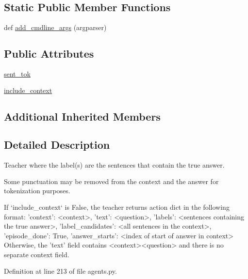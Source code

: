 \subsection*{Static Public Member Functions}
\begin{DoxyCompactItemize}
\item 
def \hyperlink{classparlai_1_1tasks_1_1squad_1_1agents_1_1SentenceTeacher_a7cbe635ae17b8deee040f3f23e9163fa}{add\+\_\+cmdline\+\_\+args} (argparser)
\end{DoxyCompactItemize}
\subsection*{Public Attributes}
\begin{DoxyCompactItemize}
\item 
\hyperlink{classparlai_1_1tasks_1_1squad_1_1agents_1_1SentenceTeacher_a35acf467970e62528b74dd9a3dcc45a9}{sent\+\_\+tok}
\item 
\hyperlink{classparlai_1_1tasks_1_1squad_1_1agents_1_1SentenceTeacher_a499aa8bdcd4d4af34d87a79fe7186854}{include\+\_\+context}
\end{DoxyCompactItemize}
\subsection*{Additional Inherited Members}


\subsection{Detailed Description}
\begin{DoxyVerb}Teacher where the label(s) are the sentences that contain the true
answer.

Some punctuation may be removed from the context and the answer for
tokenization purposes.

If `include_context` is False, the teacher returns action dict in the
following format:
{
    'context': <context>,
    'text': <question>,
    'labels': <sentences containing the true answer>,
    'label_candidates': <all sentences in the context>,
    'episode_done': True,
    'answer_starts': <index of start of answer in context>
}
Otherwise, the 'text' field contains <context>\n<question> and there is
no separate context field.
\end{DoxyVerb}
 

Definition at line 213 of file agents.\+py.




